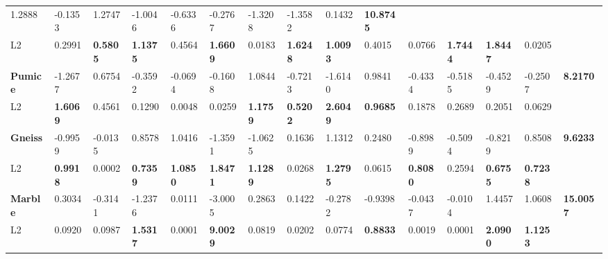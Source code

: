 \begin{landscape}
\begin{table}[]
{\begin{tabular}{@{}lllllllllllllll@{}}
  1.2888 &
  -0.1353 &
  1.2747 &
  -1.0046 &
  -0.6336 &
  -0.2767 &
  -1.3208 &
  -1.3582 &
  0.1432 &
  \textbf{10.8745} \\
L2 &
  0.2991 &
  \cellcolor[HTML]{FFF2CC}\textbf{0.5805} &
  \cellcolor[HTML]{FFD966}\textbf{1.1375} &
  0.4564 &
  \cellcolor[HTML]{FFC000}\textbf{1.6609} &
  0.0183 &
  \cellcolor[HTML]{FFC000}\textbf{1.6248} &
  \cellcolor[HTML]{FFD966}\textbf{1.0093} &
  0.4015 &
  0.0766 &
  \cellcolor[HTML]{FFC000}\textbf{1.7444} &
  \cellcolor[HTML]{FFC000}\textbf{1.8447} &
  0.0205 &
  \textbf{} \\
\rowcolor[HTML]{E7E6E6} 
\textbf{Pumice} &
  -1.2677 &
  0.6754 &
  -0.3592 &
  -0.0694 &
  -0.1608 &
  1.0844 &
  -0.7213 &
  -1.6140 &
  0.9841 &
  -0.4334 &
  -0.5185 &
  -0.4529 &
  -0.2507 &
  \textbf{8.2170} \\
L2 &
  \cellcolor[HTML]{FFC000}\textbf{1.6069} &
  0.4561 &
  0.1290 &
  0.0048 &
  0.0259 &
  \cellcolor[HTML]{FFD966}\textbf{1.1759} &
  \cellcolor[HTML]{FFF2CC}\textbf{0.5202} &
  \cellcolor[HTML]{F8CBAD}\textbf{2.6049} &
  \cellcolor[HTML]{FFF2CC}\textbf{0.9685} &
  0.1878 &
  0.2689 &
  0.2051 &
  0.0629 &
  \textbf{} \\
\rowcolor[HTML]{E7E6E6} 
\textbf{Gneiss} &
  -0.9959 &
  -0.0135 &
  0.8578 &
  1.0416 &
  -1.3591 &
  -1.0625 &
  0.1636 &
  1.1312 &
  0.2480 &
  -0.8989 &
  -0.5094 &
  -0.8219 &
  0.8508 &
  \textbf{9.6233} \\
L2 &
  \cellcolor[HTML]{FFF2CC}\textbf{0.9918} &
  0.0002 &
  \cellcolor[HTML]{FFF2CC}\textbf{0.7359} &
  \cellcolor[HTML]{FFD966}\textbf{1.0850} &
  \cellcolor[HTML]{FFC000}\textbf{1.8471} &
  \cellcolor[HTML]{FFD966}\textbf{1.1289} &
  0.0268 &
  \cellcolor[HTML]{FFD966}\textbf{1.2795} &
  0.0615 &
  \cellcolor[HTML]{FFF2CC}\textbf{0.8080} &
  0.2594 &
  \cellcolor[HTML]{FFF2CC}\textbf{0.6755} &
  \cellcolor[HTML]{FFF2CC}\textbf{0.7238} &
  \textbf{} \\
\rowcolor[HTML]{E7E6E6} 
\textbf{Marble} &
  0.3034 &
  -0.3141 &
  -1.2376 &
  0.0111 &
  -3.0005 &
  0.2863 &
  0.1422 &
  -0.2782 &
  -0.9398 &
  -0.0437 &
  -0.0104 &
  1.4457 &
  1.0608 &
  \textbf{15.0057} \\
L2 &
  0.0920 &
  0.0987 &
  \cellcolor[HTML]{FFC000}\textbf{1.5317} &
  0.0001 &
  \cellcolor[HTML]{ED7D31}\textbf{9.0029} &
  0.0819 &
  0.0202 &
  0.0774 &
  \cellcolor[HTML]{FFF2CC}\textbf{0.8833} &
  0.0019 &
  0.0001 &
  \cellcolor[HTML]{F8CBAD}\textbf{2.0900} &
  \cellcolor[HTML]{FFD966}\textbf{1.1253} &
  \textbf{} \\

\end{tabular}}
\end{table}
\end{landscape}
